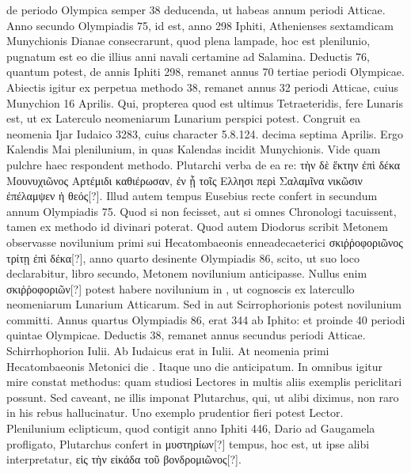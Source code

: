 de periodo Olympica semper 38 deducenda, ut habeas annum
periodi Atticae.
Anno secundo Olympiadis 75, id est, anno 298 Iphiti,
Athenienses sextamdicam Munychionis Dianae consecrarunt,
quod plena lampade, hoc est plenilunio, pugnatum est eo die illius
anni navali certamine ad Salamina.
Deductis 76, quantum potest,
de annis Iphiti 298, remanet annus 70 tertiae periodi Olympicae.
Abiectis igitur ex perpetua methodo 38, remanet annus 32 periodi
Atticae, cuius Munychion 16 Aprilis.
Qui, propterea quod est ultimus
Tetraeteridis, fere Lunaris est, ut ex Laterculo neomeniarum
Lunarium perspici potest.
Congruit ea neomenia Ijar Iudaico 3283,
cuius character 5.8.124. decima septima Aprilis.
Ergo Kalendis
Mai plenilunium, in quas Kalendas incidit  Munychionis.
Vide quam pulchre haec respondent methodo.
Plutarchi verba de
ea re: \textgreek{τὴν δὲ ἕκτην ἐπὶ δέκα Μουνυχιῶνος Αρτέμιδι καθιέρωσαν, ἐν ᾗ τοῖς
Ελλησι περὶ Σαλαμῖνα νικῶσιν ἐπέλαμψεν ἡ θεός[?]}.
Illud autem tempus Eusebius
recte confert in secundum annum Olympiadis 75.
Quod
si non fecisset, aut si omnes Chronologi tacuissent, tamen ex methodo
id divinari poterat.
Quod autem Diodorus scribit Metonem
observasse novilunium primi sui Hecatombaeonis enneadecaeterici
\textgreek{σκιῤῥοφοριῶνος τρίτῃ ἐπὶ δέκα[?]}, anno quarto desinente
 Olympiadis 86,
scito, ut suo loco declarabitur, libro secundo, Metonem novilunium
anticipasse.
%
Nullus enim \textgreek{σκιῤῥοφοριῶν[?]}
 potest habere novilunium in
, ut cognoscis ex latercullo neomeniarum Lunarium Atticarum.
Sed in  aut  Scirrophorionis potest
 novilunium committi.
Annus quartus Olympiadis 86, erat 344 ab Iphito: et proinde
40 periodi quintae Olympicae.
Deductis 38, remanet annus
secundus periodi Atticae.
Schirrhophorion  Iulii.
Ab Iudaicus
erat in  Iulii.
At neomenia primi Hecatombaeonis Metonici
die .
Itaque uno die anticipatum.
In omnibus igitur mire constat
methodus: quam studiosi Lectores in multis aliis exemplis periclitari
possunt.
Sed caveant, ne illis imponat Plutarchus, qui, ut alibi
diximus, non raro in his rebus hallucinatur.
Uno exemplo prudentior
fieri potest Lector.
Plenilunium eclipticum, quod contigit anno
Iphiti 446, Dario ad Gaugamela profligato, Plutarchus confert
in \textgreek{μυστηρίων[?]} tempus, hoc est, ut ipse alibi interpretatur,
 \textgreek{εἰς τὴν εἰκάδα
τοῦ βονδρομιῶνος[?]}.
